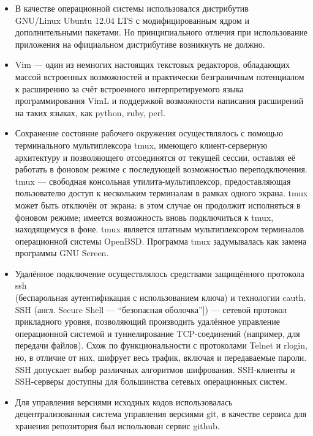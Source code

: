 \begin{itemize}

\item В качестве операционной системы использовался дистрибутив\\ GNU/Linux
  Ubuntu 12.04 LTS с модифицированным ядром и дополнительными пакетами. Но
  принципиального отличия при использование приложения на официальном
  дистрибутиве возникнуть не должно.

\item Vim --- один из немногих настоящих текстовых редакторов,
  обладающих массой встроенных возможностей и практически безграничным
  потенциалом к расширению за счёт встроенного интерпретируемого языка
  программирования VimL и поддержкой возможности написания расширений на
  таких языках, как python, ruby, perl.

\item Сохранение состояние рабочего окружения осуществлялось с помощью
  терминального мультиплексора tmux, имеющего клиент-серверную архитектуру и
  позволяющего отсоединятся от текущей сессии, оставляя её работать в фоновом
  режиме с последующей возможностью переподключения.
  tmux --- свободная консольная утилита-мультиплексор,
  предоставляющая пользователю доступ к нескольким терминалам в рамках
  одного экрана. tmux может быть отключён от экрана: в этом случае он
  продолжит исполняться в фоновом режиме; имеется возможность вновь
  подключиться к tmux, находящемуся в фоне. tmux является штатным
  мультиплексором терминалов операционной системы OpenBSD.
  Программа tmux задумывалась как замена программы GNU Screen.

\item Удалённое подключение осуществлялось средствами защищённого протокола
ssh\\
(беспарольная аутентификация с использованием ключа) и технологии cauth.
SSH (англ. Secure Shell --- ``безопасная оболочка'']) --- сетевой протокол
прикладного уровня, позволяющий производить удалённое управление операционной
системой и туннелирование TCP-соединений (например, для передачи файлов).
Схож по функциональности с протоколами Telnet и rlogin, но, в отличие от них,
шифрует весь трафик, включая и передаваемые пароли. SSH допускает выбор
различных алгоритмов шифрования. SSH-клиенты и SSH-серверы доступны для
большинства сетевых операционных систем.

\item Для управления версиями исходных кодов использовалась децентрализованная
  система управления версиями git, в качестве сервиса для хранения репозитория
  был использован сервис github.

\end{itemize}

